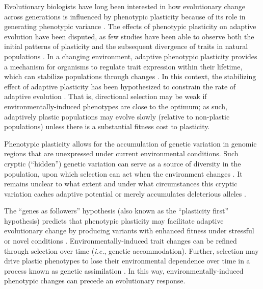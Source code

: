 Evolutionary biologists have long been interested in how evolutionary change across generations is influenced by phenotypic plasticity because of its role in generating phenotypic variance \citep{gibert_phenotypic_2019}.
The effects of phenotypic plasticity on adaptive evolution have been disputed, as few studies have been able to observe both the initial patterns of plasticity and the subsequent divergence of traits in natural populations \citep{ghalambor_adaptive_2007,wund_assessing_2012,forsman_rethinking_2015,ghalambor_non-adaptive_2015,hendry_key_2016}.
In a changing environment, adaptive phenotypic plasticity provides a mechanism for organisms to regulate trait expression within their lifetime, which can stabilize populations through changes \citep{gibert_phenotypic_2019}.
In this context, the stabilizing effect of adaptive plasticity has been hypothesized to constrain the rate of adaptive evolution \citep{gupta_study_1982,ancel_undermining_2000,huey_behavioral_2003,price_role_2003,paenke_influence_2007}.
That is, directional selection may be weak if environmentally-induced phenotypes are close to the optimum; as such, adaptively plastic populations may evolve slowly (relative to non-plastic populations) unless there is a substantial fitness cost to plasticity.



Phenotypic plasticity allows for the accumulation of genetic variation in genomic regions that are unexpressed under current environmental conditions.
Such cryptic (``hidden'') genetic variation can serve as a source of diversity in the population, upon which selection can act when the environment changes \citep{schlichting_hidden_2008,levis_evaluating_2016}.  
It remains unclear to what extent and under what circumstances this cryptic variation caches adaptive potential or merely accumulates deleterious alleles \citep{gibson_uncovering_2004,paaby_cryptic_2014,zheng_cryptic_2019}.

The ``genes as followers'' hypothesis (also known as the ``plasticity first'' hypothesis) predicts that phenotypic plasticity may facilitate adaptive evolutionary change by producing variants with enhanced fitness under stressful or novel conditions \citep{west-eberhard_developmental_2003,schwander_genes_2011,levis_evaluating_2016}. 
Environmentally-induced trait changes can be refined through selection over time (\textit{i.e.}, genetic accommodation).
Further, selection may drive plastic phenotypes to lose their environmental dependence over time in a process known as genetic assimilation \citep{west-eberhard_developmental_2005,pigliucci_phenotypic_2006,crispo_baldwin_2007,schlichting_phenotypic_2014,levis_evaluating_2016}. 
In this way, environmentally-induced phenotypic changes can precede an evolutionary response.

